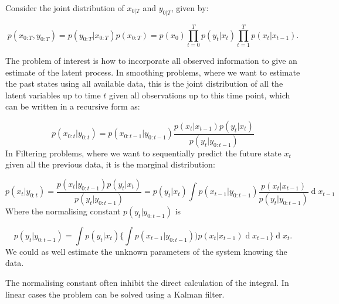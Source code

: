 \documentclass[11pt,a4paper]{article}
\renewcommand{\d}[1]{\ensuremath{\operatorname{d}\!{#1}}}
\begin{document}
Consider the joint distribution of $x_{0 | T}$ and $y_{0 | T}$, given by:

\[
p(x_{0 : T}, y_{0 : T}) = p(y_{0 : T} | x_{0 : T}) p(x_{0 : T}) = p(x_0) \prod_{t = 0}^T p(y_t | x_{t}) \prod_{t = 1}^T p(x_t | x_{t - 1}).
\]

The problem of interest is how to incorporate all observed information to give an estimate of the latent process. In smoothing problems, where we want to estimate the past states using all available data, this is the joint distribution of all the latent variables up to time $t$ given all observations up to this time point, which can be written in a recursive form as:


\[
p(x_{0 : t} | y_{0 : t}) = p(x_{0 : t - 1} | y_{0 : t - 1}) \frac{ p(x_{t} | x_{t - 1}) p(y_{t} | x_{t})}{p(y_{t} | y_{0 : t - 1})}
\]
In Filtering problems, where we want to sequentially predict the future state $x_t$ given all the previous data, it is the marginal distribution:

\[
p(x_{t} | y_{0 : t}) = \frac{ p(x_{t} | y_{0 : t - 1}) p(y_{t} | x_{t})}{p(y_{t} | y_{0 : t - 1})} = p(y_{t} | x_{t}) \int p(x_{t - 1} | y_{0 : t - 1}) \frac{p(x_t | x_{t - 1})}{p(y_t | y_{0 : t - 1})} \d x_{t - 1}
\]
Where the normalising constant $p(y_{t} | y_{0 : t - 1})$ is

\[
p(y_{t} | y_{0 : t - 1}) = \int p(y_{t} | x_{t}) \Bigg \{ \int p(x_{t - 1} | y_{0 : t - 1})) p(x_t | x_{t - 1}) \d x_{t - 1}\Bigg\} \d x_t.
\]
We could as well estimate the unknown parameters of the system knowing the data.

The normalising constant often inhibit the direct calculation of the integral. In linear cases the problem can be solved using a Kalman filter.
\end{document}
